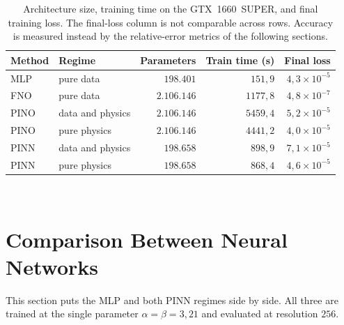 \begin{table}[htbp]
    \centering
    \caption{Architecture size, training time on the GTX~1660~SUPER, and final training loss. The final-loss column is not comparable across rows. Accuracy is measured instead by the relative-error metrics of the following sections.}
    \label{tab:training}
    \small
    \begin{tabular}{llrrr}
        \hline
        \textbf{Method} & \textbf{Regime} & \textbf{Parameters} & \textbf{Train time (s)} & \textbf{Final loss} \\
        \hline
        MLP  & pure data        & $198.401$     & $151{,}9$  & $4{,}3 \times 10^{-5}$ \\
        FNO  & pure data        & $2.106.146$ & $1177{,}8$ & $4{,}8 \times 10^{-7}$ \\
        PINO & data and physics & $2.106.146$ & $5459{,}4$ & $5{,}2 \times 10^{-5}$ \\
        PINO & pure physics     & $2.106.146$ & $4441{,}2$ & $4{,}0 \times 10^{-5}$ \\
        PINN & data and physics & $198.658$     & $898{,}9$  & $7{,}1 \times 10^{-5}$ \\
        PINN & pure physics     & $198.658$     & $868{,}4$  & $4{,}6 \times 10^{-5}$ \\
        \hline
    \end{tabular}
    \\[0.4em]
    \autoriapropria
\end{table}

\section{Comparison Between Neural Networks}
\label{sec:r_nn_comparison}

This section puts the MLP and both PINN regimes side by side. All three are trained at the single parameter $\alpha = \beta = 3{,}21$ and evaluated at resolution $256$.

